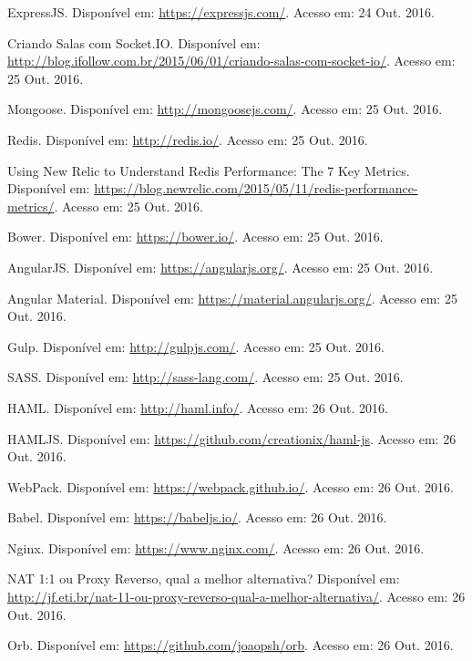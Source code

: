 \documentclass[brazil,ruledheader]{abntifes}
\begin{document}
\begin{thebibliography}{9}
		ExpressJS. Disponível em: \url{https://expressjs.com/}.
		Acesso em: 24 Out. 2016.
		
		Criando Salas com Socket.IO. Disponível em: \url{http://blog.ifollow.com.br/2015/06/01/criando-salas-com-socket-io/}.
		Acesso em: 25 Out. 2016.
		
		Mongoose. Disponível em: \url{http://mongoosejs.com/}.
		Acesso em: 25 Out. 2016.
		
		Redis. Disponível em: \url{http://redis.io/}.
		Acesso em: 25 Out. 2016.
		
		Using New Relic to Understand Redis Performance: The 7 Key Metrics. Disponível em: \url{https://blog.newrelic.com/2015/05/11/redis-performance-metrics/}.
		Acesso em: 25 Out. 2016.
		
		Bower. Disponível em: \url{https://bower.io/}.
		Acesso em: 25 Out. 2016.
		
		AngularJS. Disponível em: \url{https://angularjs.org/}.
		Acesso em: 25 Out. 2016.
		
		Angular Material. Disponível em: \url{https://material.angularjs.org/}.
		Acesso em: 25 Out. 2016.
		
		Gulp. Disponível em: \url{http://gulpjs.com/}.
		Acesso em: 25 Out. 2016.
		
		SASS. Disponível em: \url{http://sass-lang.com/}.
		Acesso em: 25 Out. 2016.
		
		HAML. Disponível em: \url{http://haml.info/}.
		Acesso em: 26 Out. 2016.
		
		HAMLJS. Disponível em: \url{https://github.com/creationix/haml-js}.
		Acesso em: 26 Out. 2016.
		
		WebPack. Disponível em: \url{https://webpack.github.io/}.
		Acesso em: 26 Out. 2016.
		
		Babel. Disponível em: \url{https://babeljs.io/}.
		Acesso em: 26 Out. 2016.
		
		Nginx. Disponível em: \url{https://www.nginx.com/}.
		Acesso em: 26 Out. 2016.
		
		NAT 1:1 ou Proxy Reverso, qual a melhor alternativa? Disponível em: \url{http://jf.eti.br/nat-11-ou-proxy-reverso-qual-a-melhor-alternativa/}.
		Acesso em: 26 Out. 2016.
		
		Orb. Disponível em: \url{https://github.com/joaopsh/orb}.
		Acesso em: 26 Out. 2016.
		

\end{thebibliography}
\end{document}
